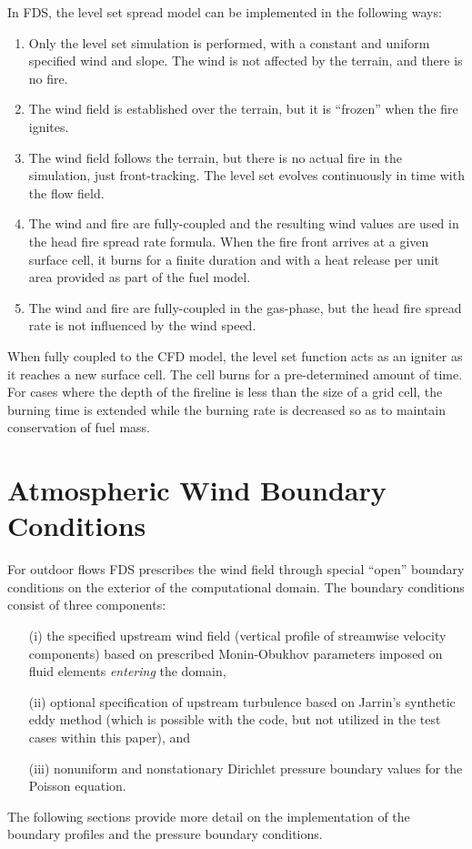 \documentclass[journal,article,atmosphere,submit,moreauthors,pdftex]{Definitions_Review_Process/mdpi}
\begin{document}
In FDS, the level set spread model can be implemented in the following ways:
\begin{enumerate}
\item Only the level set simulation is performed, with a constant and uniform specified wind and slope. The wind is not affected by the terrain, and there is no fire.
\item The wind field is established over the terrain, but it is ``frozen'' when the fire ignites.
\item The wind field follows the terrain, but there is no actual fire in the simulation, just front-tracking.  The level set evolves continuously in time with the flow field.
\item The wind and fire are fully-coupled and the resulting wind values are used in the head fire spread rate formula. When the fire front arrives at a given surface cell, it burns for a finite duration and with a heat release per unit area provided as part of the fuel model.
\item The wind and fire are fully-coupled in the gas-phase, but the head fire spread rate is not influenced by the wind speed. 
\end{enumerate}
When fully coupled to the CFD model, the level set function acts as an igniter as it reaches a new surface cell. The cell burns for a pre-determined amount of time. For cases where the depth of the fireline is less than the size of a grid cell, the burning time is extended while the burning rate is decreased so as to maintain conservation of fuel mass.



\section{Atmospheric Wind Boundary Conditions}
\label{sec:wind}

For outdoor flows FDS prescribes the wind field through special ``open'' boundary conditions on the exterior of the computational domain.  The boundary conditions consist of three components:
\begin{enumerate}
\item[(i)] the specified upstream wind field (vertical profile of streamwise velocity components) based on prescribed Monin-Obukhov parameters imposed on fluid elements \emph{entering} the domain,
\item[(ii)] optional specification of upstream turbulence based on Jarrin's synthetic eddy method \cite{Jarrin:2008} (which is possible with the code, but not utilized in the test cases within this paper), and
\item[(iii)] nonuniform and nonstationary Dirichlet pressure boundary values for the Poisson equation.
\end{enumerate}
The following sections provide more detail on the implementation of the boundary profiles and the pressure boundary conditions.
\end{document}
